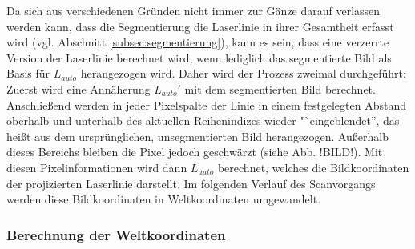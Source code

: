 Da sich aus verschiedenen Gründen nicht immer zur Gänze darauf verlassen werden kann, dass die Segmentierung die Laserlinie in ihrer  Gesamtheit erfasst wird (vgl. Abschnitt \ref{subsec:segmentierung}), kann es sein, dass eine verzerrte Version der Laserlinie berechnet wird, wenn lediglich das segmentierte Bild als Basis für \(L_{auto}\) herangezogen wird. Daher wird der Prozess zweimal durchgeführt: Zuerst wird eine Annäherung \(L_{auto}\prime\) mit dem segmentierten Bild berechnet. Anschließend werden in jeder Pixelspalte der Linie in einem festgelegten Abstand oberhalb und unterhalb des aktuellen Reihenindizes wieder "`eingeblendet'', das heißt aus dem ursprünglichen, unsegmentierten Bild herangezogen. Außerhalb dieses Bereichs bleiben die Pixel jedoch geschwärzt (siehe Abb. !BILD!). Mit diesen Pixelinformationen wird dann \(L_{auto}\) berechnet, welches die Bildkoordinaten der projizierten Laserlinie darstellt. Im folgenden Verlauf des Scanvorgangs werden diese Bildkoordinaten in Weltkoordinaten umgewandelt.

\subsubsection{Berechnung der Weltkoordinaten}
